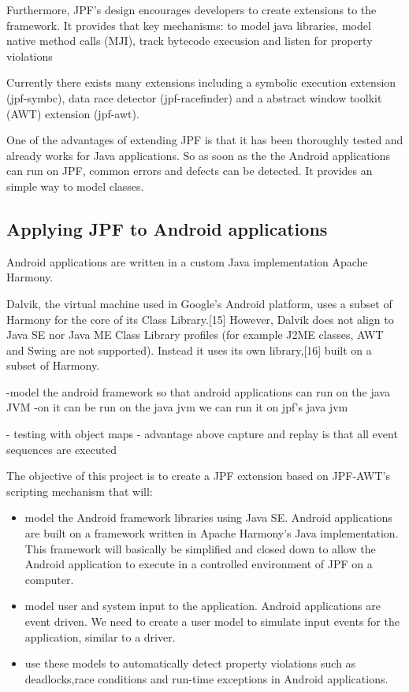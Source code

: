 \documentclass{acm_proc_article-sp}
\begin{document}
Furthermore, JPF's design encourages developers to create extensions to the framework. It provides that key mechanisms:
to model java libraries,
model native method calls (MJI),
track bytecode execusion and listen for property violations


Currently there exists many extensions including a symbolic execution extension (jpf-symbc), data race detector (jpf-racefinder) and a
abstract window toolkit (AWT) extension (jpf-awt).

One of the advantages of extending JPF is that it has been thoroughly tested and already works for Java applications. So as soon as the the
Android applications can run on JPF, common errors and defects can be detected. It provides an simple way to model classes.

\subsection{Applying JPF to Android applications}
Android applications are written in a custom Java implementation Apache Harmony.

Dalvik, the virtual machine used in Google's Android platform, uses a subset of Harmony for the core of its Class Library.[15] However,
Dalvik does not align to Java SE nor Java ME Class Library profiles (for example J2ME classes, AWT and Swing are not supported). Instead it
uses its own library,[16] built on a subset of Harmony.

-model the android framework so that android applications can run on the java JVM
-on it can be run on the java jvm we can run it on jpf’s java jvm

- testing with object maps
- advantage above capture and replay is that all event sequences are executed


The objective of this project is to create a JPF extension based on JPF-AWT's scripting mechanism that will:
\begin{itemize}
 \item model the Android framework libraries using Java SE. Android applications are built on a framework written in Apache Harmony's Java
implementation. This framework will basically be simplified and closed down to allow the Android application to execute in a controlled
environment of JPF on a computer.

 \item model user and system input to the application. Android applications are event driven. We need to create a user model to simulate
input events for the application, similar to a driver. 

 \item use these models to automatically detect property violations such as deadlocks,race conditions and run-time exceptions in Android
applications.

\end{itemize}
\newpage
\end{document}
